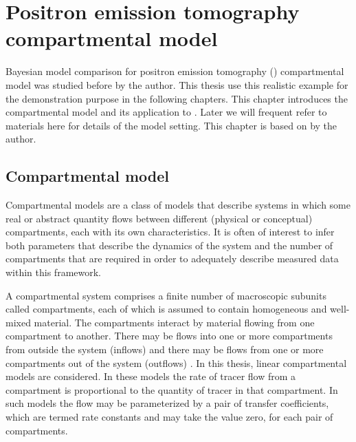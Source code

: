 \chapter{Positron emission tomography compartmental model}
\label{cha:Positron emission tomography compartmental model}

Bayesian model comparison for positron emission tomography (\pet)
compartmental model was studied before by the author. This thesis use this
realistic example for the demonstration purpose in the following chapters.
This chapter introduces the compartmental model and its application to \pet.
Later we will frequent refer to materials here for details of the model
setting. This chapter is based on \cite{Zhou2013} by the author.

\section{Compartmental model}
\label{sec:Compartmental model}

Compartmental models are a class of models that describe systems in which some
real or abstract quantity flows between different (physical or conceptual)
compartments, each with its own characteristics. It is often of interest to
infer both parameters that describe the dynamics of the system and the number
of compartments that are required in order to adequately describe measured
data within this framework.

A compartmental system comprises a finite number of macroscopic subunits
called compartments, each of which is assumed to contain homogeneous and
well-mixed material. The compartments interact by material flowing from one
compartment to another. There may be flows into one or more compartments from
outside the system (inflows) and there may be flows from one or more
compartments out of the system (outflows) \cite{Jacquez:1996gc}. In this
thesis, linear compartmental models are considered. In these models the rate
of tracer flow from a compartment is proportional to the quantity of tracer in
that compartment. In such models the flow may be parameterized by a pair of
transfer coefficients, which are termed rate constants and may take the value
zero, for each pair of compartments.

